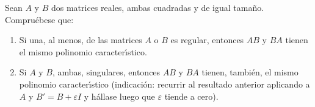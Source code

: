 \begin{enunciado}
 Sean $A$ y $B$ dos matrices reales, ambas cuadradas y de igual tama\~no. Compru\'ebese que:
 \begin{enumerate}[$a$)]
  \item Si una, al menos, de las matrices $A$ o $B$ es regular, entonces $AB$ y $BA$ tienen el mismo polinomio caracter\'{\i}stico.
  \item Si $A$ y $B$, ambas, singulares, entonces $AB$ y $BA$ tienen, tambi\'en, el mismo polinomio caracter\'{\i}stico (indicaci\'on: recurrir al resultado anterior aplicando a $A$ y $B' = B + \varepsilon I$ y h\'allase luego que $\varepsilon$ tiende a cero).
 \end{enumerate}

\end{enunciado}

